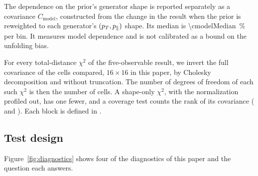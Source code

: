 The dependence on the prior's generator shape is reported separately as a covariance $C_{\mathrm{model}}$, constructed from the change in the result when the prior is reweighted to each generator's $(p_{T},p_{\parallel})$ shape. Its median is \SI{\cmodelMedian}{\percent} per bin. It measures model dependence and is not calibrated as a bound on the unfolding bias.

For every total-distance $\chi^2$ of the five-observable result, we invert the full covariance of the cells compared, $16\times16$ in this paper, by Cholesky decomposition and without truncation. The number of degrees of freedom of each such $\chi^2$ is then the number of cells. A shape-only $\chi^2$, with the normalization profiled out, has one fewer, and a coverage test counts the rank of its covariance ( and ). Each block is defined in .

\subsection{Test design}
\label{sec:strategy}

Figure~\ref{fig:diagnostics} shows four of the diagnostics of this paper and the question each answers.

